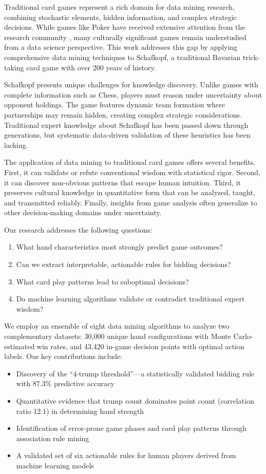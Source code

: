 \documentclass[conference]{IEEEtran}
\begin{document}
Traditional card games represent a rich domain for data mining research, combining stochastic elements, hidden information, and complex strategic decisions. While games like Poker have received extensive attention from the research community \cite{billings2002challenge}, many culturally significant games remain understudied from a data science perspective. This work addresses this gap by applying comprehensive data mining techniques to Schafkopf, a traditional Bavarian trick-taking card game with over 200 years of history.

Schafkopf presents unique challenges for knowledge discovery. Unlike games with complete information such as Chess, players must reason under uncertainty about opponent holdings. The game features dynamic team formation where partnerships may remain hidden, creating complex strategic considerations. Traditional expert knowledge about Schafkopf has been passed down through generations, but systematic data-driven validation of these heuristics has been lacking.

The application of data mining to traditional card games offers several benefits. First, it can validate or refute conventional wisdom with statistical rigor. Second, it can discover non-obvious patterns that escape human intuition. Third, it preserves cultural knowledge in quantitative form that can be analyzed, taught, and transmitted reliably. Finally, insights from game analysis often generalize to other decision-making domains under uncertainty.

Our research addresses the following questions:
\begin{enumerate}
    \item What hand characteristics most strongly predict game outcomes?
    \item Can we extract interpretable, actionable rules for bidding decisions?
    \item What card play patterns lead to suboptimal decisions?
    \item Do machine learning algorithms validate or contradict traditional expert wisdom?
\end{enumerate}

We employ an ensemble of eight data mining algorithms to analyze two complementary datasets: 30,000 unique hand configurations with Monte Carlo-estimated win rates, and 43,420 in-game decision points with optimal action labels. Our key contributions include:

\begin{itemize}
    \item Discovery of the ``4-trump threshold''—a statistically validated bidding rule with 87.3\% predictive accuracy
    \item Quantitative evidence that trump count dominates point count (correlation ratio 12:1) in determining hand strength
    \item Identification of error-prone game phases and card play patterns through association rule mining
    \item A validated set of six actionable rules for human players derived from machine learning models
\end{itemize}
\end{document}
